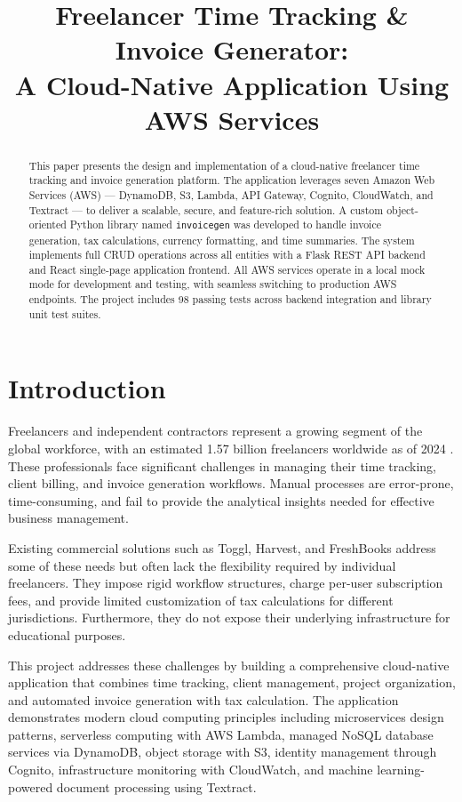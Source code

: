 \documentclass[conference]{IEEEtran}
\title{Freelancer Time Tracking \& Invoice Generator:\\A Cloud-Native Application Using AWS Services}
\author{
\IEEEauthorblockN{Goutham Uppu}
\IEEEauthorblockA{Student ID: 25167936\\
x25167936@student.ncirl.ie\\
MSc in Cloud Computing\\
National College of Ireland\\
Module: Cloud Platform Programming}
}
\begin{document}
\maketitle

\begin{abstract}
This paper presents the design and implementation of a cloud-native freelancer time tracking and invoice generation platform. The application leverages seven Amazon Web Services (AWS) --- DynamoDB, S3, Lambda, API Gateway, Cognito, CloudWatch, and Textract --- to deliver a scalable, secure, and feature-rich solution. A custom object-oriented Python library named \texttt{invoicegen} was developed to handle invoice generation, tax calculations, currency formatting, and time summaries. The system implements full CRUD operations across all entities with a Flask REST API backend and React single-page application frontend. All AWS services operate in a local mock mode for development and testing, with seamless switching to production AWS endpoints. The project includes 98 passing tests across backend integration and library unit test suites.
\end{abstract}

\section{Introduction}

Freelancers and independent contractors represent a growing segment of the global workforce, with an estimated 1.57 billion freelancers worldwide as of 2024 \cite{aws}. These professionals face significant challenges in managing their time tracking, client billing, and invoice generation workflows. Manual processes are error-prone, time-consuming, and fail to provide the analytical insights needed for effective business management.

Existing commercial solutions such as Toggl, Harvest, and FreshBooks address some of these needs but often lack the flexibility required by individual freelancers. They impose rigid workflow structures, charge per-user subscription fees, and provide limited customization of tax calculations for different jurisdictions. Furthermore, they do not expose their underlying infrastructure for educational purposes.

This project addresses these challenges by building a comprehensive cloud-native application that combines time tracking, client management, project organization, and automated invoice generation with tax calculation. The application demonstrates modern cloud computing principles including microservices design patterns, serverless computing with AWS Lambda, managed NoSQL database services via DynamoDB, object storage with S3, identity management through Cognito, infrastructure monitoring with CloudWatch, and machine learning-powered document processing using Textract.
\end{document}
